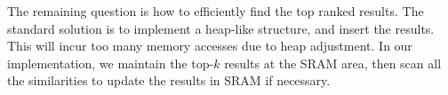 The remaining question is how to efficiently find the top ranked results. The standard solution is to implement a heap-like structure, and insert the results. This will incur too many memory accesses due to heap adjustment. In our implementation, we maintain the top-$k$ results at the SRAM area, then scan all the similarities to update the results in SRAM if necessary. 